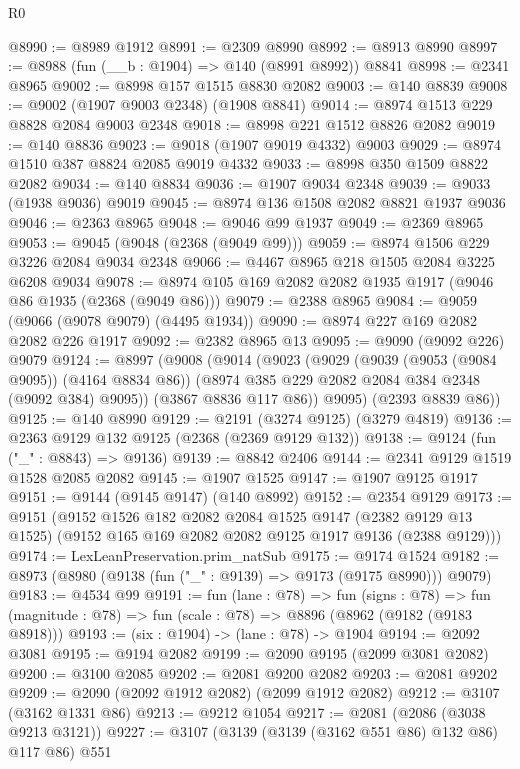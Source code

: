 \begin{lexlean}{R0}
\begin{coremodule}
@8990 := @8989 @1912
@8991 := @2309 @8990
@8992 := @8913 @8990
@8997 := @8988 (fun (__b : @1904) => @140 (@8991 @8992)) @8841
@8998 := @2341 @8965
@9002 := @8998 @157 @1515 @8830 @2082
@9003 := @140 @8839
@9008 := @9002 (@1907 @9003 @2348) (@1908 @8841)
@9014 := @8974 @1513 @229 @8828 @2084 @9003 @2348
@9018 := @8998 @221 @1512 @8826 @2082
@9019 := @140 @8836
@9023 := @9018 (@1907 @9019 @4332) @9003
@9029 := @8974 @1510 @387 @8824 @2085 @9019 @4332
@9033 := @8998 @350 @1509 @8822 @2082
@9034 := @140 @8834
@9036 := @1907 @9034 @2348
@9039 := @9033 (@1938 @9036) @9019
@9045 := @8974 @136 @1508 @2082 @8821 @1937 @9036
@9046 := @2363 @8965
@9048 := @9046 @99 @1937
@9049 := @2369 @8965
@9053 := @9045 (@9048 (@2368 (@9049 @99)))
@9059 := @8974 @1506 @229 @3226 @2084 @9034 @2348
@9066 := @4467 @8965 @218 @1505 @2084 @3225 @6208 @9034
@9078 := @8974 @105 @169 @2082 @2082 @1935 @1917 (@9046 @86 @1935 (@2368 (@9049 @86)))
@9079 := @2388 @8965
@9084 := @9059 (@9066 (@9078 @9079) (@4495 @1934))
@9090 := @8974 @227 @169 @2082 @2082 @226 @1917
@9092 := @2382 @8965 @13
@9095 := @9090 (@9092 @226) @9079
@9124 := @8997
    (@9008
      (@9014
        (@9023
          (@9029
            (@9039 (@9053 (@9084 @9095)) (@4164 @8834 @86))
            (@8974 @385 @229 @2082 @2084 @384 @2348 (@9092 @384) @9095))
          (@3867 @8836 @117 @86))
        @9095)
      (@2393 @8839 @86))
@9125 := @140 @8990
@9129 := @2191 (@3274 @9125) (@3279 @4819)
@9136 := @2363 @9129 @132 @9125 (@2368 (@2369 @9129 @132))
@9138 := @9124 (fun ("_" : @8843) => @9136)
@9139 := @8842 @2406
@9144 := @2341 @9129 @1519 @1528 @2085 @2082
@9145 := @1907 @1525
@9147 := @1907 @9125 @1917
@9151 := @9144 (@9145 @9147) (@140 @8992)
@9152 := @2354 @9129
@9173 := @9151
    (@9152
      @1526
      @182
      @2082
      @2084
      @1525
      @9147
      (@2382 @9129 @13 @1525)
      (@9152 @165 @169 @2082 @2082 @9125 @1917 @9136 (@2388 @9129)))
@9174 := LexLeanPreservation.prim_natSub
@9175 := @9174 @1524
@9182 := @8973 (@8980 (@9138 (fun ("_" : @9139) => @9173 (@9175 @8990))) @9079)
@9183 := @4534 @99
@9191 := fun (lane : @78) =>
  fun (signs : @78) =>
  fun (magnitude : @78) => fun (scale : @78) => @8896 (@8962 (@9182 (@9183 @8918)))
@9193 := (six : @1904) -> (lane : @78) -> @1904
@9194 := @2092 @3081
@9195 := @9194 @2082
@9199 := @2090 @9195 (@2099 @3081 @2082)
@9200 := @3100 @2085
@9202 := @2081 @9200 @2082
@9203 := @2081 @9202
@9209 := @2090 (@2092 @1912 @2082) (@2099 @1912 @2082)
@9212 := @3107 (@3162 @1331 @86)
@9213 := @9212 @1054
@9217 := @2081 (@2086 (@3038 @9213 @3121))
@9227 := @3107 (@3139 (@3139 (@3162 @551 @86) @132 @86) @117 @86) @551

\end{coremodule}
\end{lexlean}
